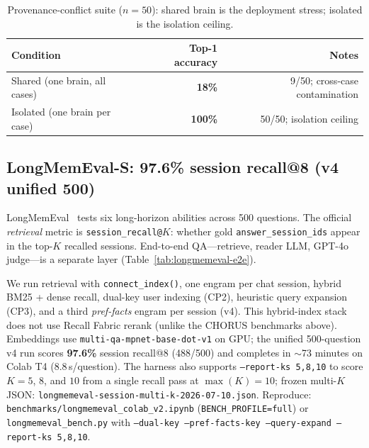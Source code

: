 \documentclass[11pt]{article}
\begin{document}
\begin{table}[h]
\centering
\caption{Provenance-conflict suite ($n{=}50$): shared brain is the deployment stress;
isolated is the isolation ceiling.}
\label{tab:provenance-conditions}
\begin{tabular}{lrr}
\toprule
Condition & Top-1 accuracy & Notes \\
\midrule
Shared (one brain, all cases) & \textbf{18\%} & 9/50; cross-case contamination \\
Isolated (one brain per case) & \textbf{100\%} & 50/50; isolation ceiling \\
\bottomrule
\end{tabular}
\end{table}

\subsection{LongMemEval-S: 97.6\% session recall@8 (v4 unified 500)}
LongMemEval~\cite{wu2024longmemeval} tests six long-horizon abilities across 500
questions. The official \emph{retrieval} metric is \texttt{session\_recall@$K$}:
whether gold \texttt{answer\_session\_ids} appear in the top-$K$ recalled
sessions. End-to-end QA---retrieve, reader LLM, GPT-4o judge---is a separate
layer (Table~\ref{tab:longmemeval-e2e}).

We run retrieval with \texttt{connect\_index()}, one engram per chat session,
hybrid BM25 + dense recall, dual-key user indexing (CP2), heuristic query
expansion (CP3), and a third \emph{pref-facts} engram per session (v4). This
hybrid-index stack does not use Recall Fabric rerank (unlike the CHORUS benchmarks
above). Embeddings use \texttt{multi-qa-mpnet-base-dot-v1} on GPU; the unified 500-question v4 run
scores \textbf{97.6\%} session recall@8 (488/500) and completes in $\sim$73 minutes on Colab T4
($8.8$\,s/question). The harness also supports \texttt{--report-ks 5,8,10} to
score $K{=}5$, $8$, and $10$ from a single recall pass at $\max(K){=}10$; frozen
multi-$K$ JSON: \texttt{longmemeval-session-multi-k-2026-07-10.json}. Reproduce:
\texttt{benchmarks/longmemeval\_colab\_v2.ipynb}
(\texttt{BENCH\_PROFILE=full}) or \texttt{longmemeval\_bench.py} with
\texttt{--dual-key --pref-facts-key --query-expand --report-ks 5,8,10}.
\end{document}
